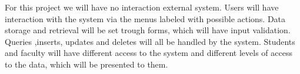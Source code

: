
For this project we will have no interaction external system. Users will have interaction with the system via the menus labeled with possible actions. Data storage and retrieval will be set trough forms, which will have input validation. 
Queries ,inserts, updates and deletes will all be handled by the system.
Students and faculty will have different access to the system and different levels of access to the data, which will be presented to them.
